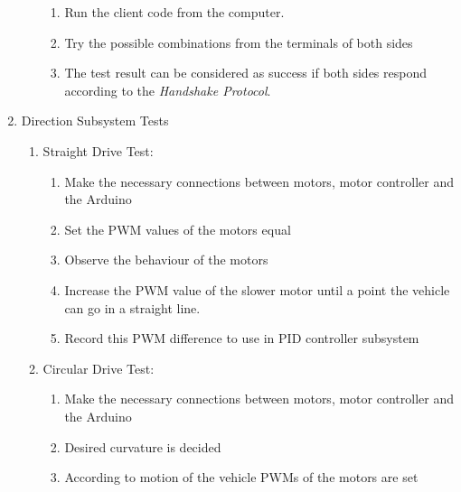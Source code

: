 \documentclass[a4paper,12pt]{article}
\begin{document}
\begin{enumerate}
\begin{enumerate}
\begin{enumerate}
\item Run the client code from the computer.  

\item Try the possible combinations from the terminals of both sides  

\item The test result can be considered as success if both sides respond according to the \textit{Handshake Protocol}. 

\end{enumerate}	


\end{enumerate}




\item {Direction Subsystem Tests}

\begin{enumerate}


\item Straight Drive Test: \label{test:a1}	


\begin{enumerate}

\item Make the necessary connections between motors, motor controller and the Arduino  

\item Set the PWM values of the motors equal  

\item Observe the behaviour of the motors  

\item Increase the PWM value of the slower motor until a point the vehicle can go in a straight line.

\item Record this PWM difference to use in PID controller subsystem

\end{enumerate}




\item Circular Drive Test: \label{test:b1}	

\begin{enumerate}

\item Make the necessary connections between motors, motor controller and the Arduino  

\item Desired curvature is decided  

\item  According to motion of the vehicle PWMs of the motors are set  


\end{enumerate}
\end{enumerate}
\end{enumerate}
\end{document}
